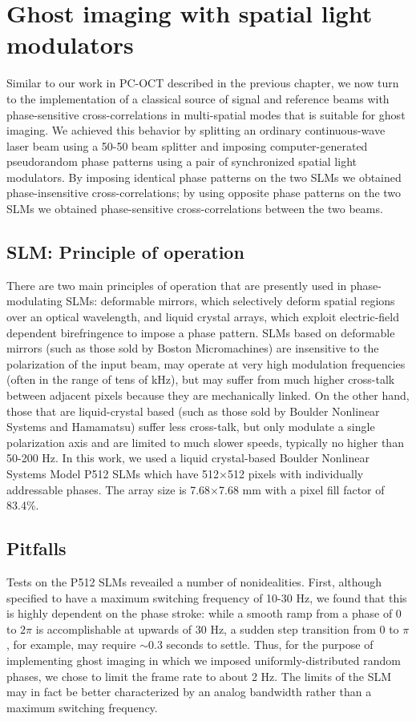 \section{Ghost imaging with spatial light modulators}

Similar to our work in PC-OCT described in the previous chapter, we now turn to the implementation of a classical source of signal and reference beams with phase-sensitive cross-correlations in multi-spatial modes that is suitable for ghost imaging. We achieved this behavior by splitting an ordinary continuous-wave laser beam using a 50-50 beam splitter and imposing computer-generated pseudorandom phase patterns using a pair of synchronized spatial light modulators. By imposing identical phase patterns on the two SLMs we obtained phase-insensitive cross-correlations; by using opposite phase patterns on the two SLMs we obtained phase-sensitive cross-correlations between the two beams.

\subsection{SLM: Principle of operation}

There are two main principles of operation that are presently used in phase-modulating SLMs: deformable mirrors, which selectively deform spatial regions over an optical wavelength, and liquid crystal arrays, which exploit electric-field dependent birefringence to impose a phase pattern. SLMs based on deformable mirrors (such as those sold by Boston Micromachines) are insensitive to the polarization of the input beam, may operate at very high modulation frequencies (often in the range of tens of kHz), but may suffer from much higher cross-talk between adjacent pixels because they are mechanically linked. On the other hand, those that are liquid-crystal based (such as those sold by Boulder Nonlinear Systems and Hamamatsu) suffer less cross-talk, but only modulate a single polarization axis and are limited to much slower speeds, typically no higher than 50-200 Hz. In this work, we used a liquid crystal-based Boulder Nonlinear Systems Model P512 SLMs which have 512$\times$512 pixels with individually addressable phases. The array size is 7.68$\times$7.68 mm with a pixel fill factor of 83.4\%.

\subsection{Pitfalls}
\label{subsection:pitfalls}
Tests on the P512 SLMs reveailed a number of nonidealities. First, although specified to have a maximum switching frequency of 10-30 Hz, we found that this is highly dependent on the phase stroke: while a smooth ramp from a phase of $0$ to $2\pi$ is accomplishable at upwards of 30 Hz, a sudden step transition from $0$ to $\pi$, for example, may require $\sim 0.3$ seconds to settle. Thus, for the purpose of implementing ghost imaging in which we imposed uniformly-distributed random phases, we chose to limit the frame rate to about 2 Hz. The limits of the SLM may in fact be better characterized by an analog bandwidth rather than a maximum switching frequency.


